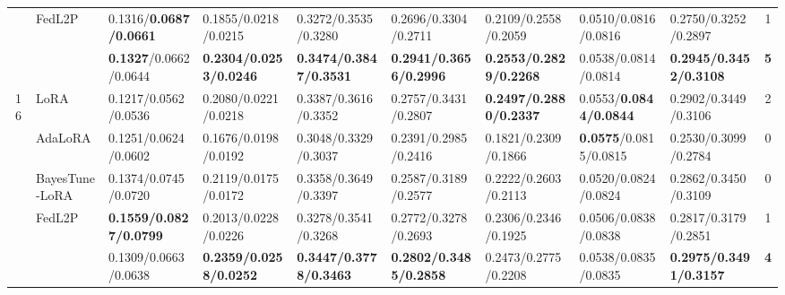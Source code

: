 \begin{table*}[t]
\begin{scriptsize}
{\begin{tabular}{c|l|l|l|l|l|l|l|l|c}
                    & FedL2P                               & 0.1316/\textbf{0.0687/0.0661}             & 0.1855/0.0218/0.0215             & 0.3272/0.3535/0.3280              & 0.2696/0.3304/0.2711             & 0.2109/0.2558/0.2059             & 0.0510/0.0816/0.0816              & 0.2750/0.3252/0.2897                                          & 1             \\ %
                    & \method{}                                 & \textbf{0.1327}/0.0662/0.0644    & \textbf{0.2304/0.0253/0.0246}    & \textbf{0.3474/0.3847/0.3531}    & \textbf{0.2941/0.3656/0.2996}    & \textbf{0.2553/0.2829/0.2268}    & 0.0538/0.0814/0.0814             & \textbf{0.2945/0.3452/0.3108}                                & \textbf{5}    \\ \hline
\multirow{5}{*}{16} & LoRA                                   & 0.1217/0.0562/0.0536             & 0.2080/0.0221/0.0218              & 0.3387/0.3616/0.3352             & 0.2757/0.3431/0.2807             & \textbf{0.2497/0.2880/0.2337}     & 0.0553/\textbf{0.0844/0.0844}             & 0.2902/0.3449/0.3106                                         & 2             \\ %
                    & AdaLoRA                              & 0.1251/0.0624/0.0602             & 0.1676/0.0198/0.0192             & 0.3048/0.3329/0.3037             & 0.2391/0.2985/0.2416             & 0.1821/0.2309/0.1866             & \textbf{0.0575}/0.0815/0.0815    & 0.2530/0.3099/0.2784                                          & 0             \\ %
                    & BayesTune-LoRA                            & 0.1374/0.0745/0.0720              & 0.2119/0.0175/0.0172             & 0.3358/0.3649/0.3397             & 0.2587/0.3189/0.2577             & 0.2222/0.2603/0.2113             & 0.0520/0.0824/0.0824              & 0.2862/0.3450/0.3109                                          & 0             \\ %
                    & FedL2P                               & \textbf{0.1559/0.0827/0.0799}    & 0.2013/0.0228/0.0226             & 0.3278/0.3541/0.3268             & 0.2772/0.3278/0.2693             & 0.2306/0.2346/0.1925             & 0.0506/0.0838/0.0838             & 0.2817/0.3179/0.2851                                         & 1             \\ %
                    & \method{}                                 & 0.1309/0.0663/0.0638             & \textbf{0.2359/0.0258/0.0252}    & \textbf{0.3447/0.3778/0.3463}    & \textbf{0.2802/0.3485/0.2858}    & 0.2473/0.2775/0.2208             & 0.0538/0.0835/0.0835             & \textbf{0.2975/0.3491/0.3157}                                & \textbf{4}    \\ \bottomrule
\end{tabular}

}
\npnoround
\end{scriptsize}
\vspace{-1.5em}
\end{table*}

